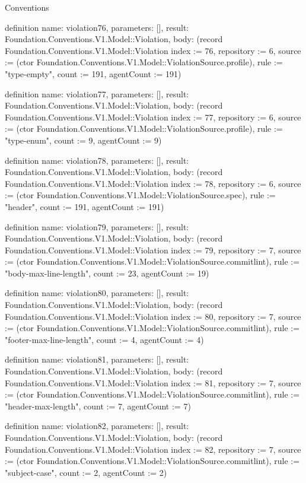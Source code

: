 \begin{lexlean}{Conventions}
\begin{semanticmodule}
definition{
  name: violation76,
  parameters: [],
  result: Foundation.Conventions.V1.Model::Violation,
  body: (record Foundation.Conventions.V1.Model::Violation {index := 76, repository := 6, source := (ctor Foundation.Conventions.V1.Model::ViolationSource.profile), rule := "type-empty", count := 191, agentCount := 191})
}

definition{
  name: violation77,
  parameters: [],
  result: Foundation.Conventions.V1.Model::Violation,
  body: (record Foundation.Conventions.V1.Model::Violation {index := 77, repository := 6, source := (ctor Foundation.Conventions.V1.Model::ViolationSource.profile), rule := "type-enum", count := 9, agentCount := 9})
}

definition{
  name: violation78,
  parameters: [],
  result: Foundation.Conventions.V1.Model::Violation,
  body: (record Foundation.Conventions.V1.Model::Violation {index := 78, repository := 6, source := (ctor Foundation.Conventions.V1.Model::ViolationSource.spec), rule := "header", count := 191, agentCount := 191})
}

definition{
  name: violation79,
  parameters: [],
  result: Foundation.Conventions.V1.Model::Violation,
  body: (record Foundation.Conventions.V1.Model::Violation {index := 79, repository := 7, source := (ctor Foundation.Conventions.V1.Model::ViolationSource.commitlint), rule := "body-max-line-length", count := 23, agentCount := 19})
}

definition{
  name: violation80,
  parameters: [],
  result: Foundation.Conventions.V1.Model::Violation,
  body: (record Foundation.Conventions.V1.Model::Violation {index := 80, repository := 7, source := (ctor Foundation.Conventions.V1.Model::ViolationSource.commitlint), rule := "footer-max-line-length", count := 4, agentCount := 4})
}

definition{
  name: violation81,
  parameters: [],
  result: Foundation.Conventions.V1.Model::Violation,
  body: (record Foundation.Conventions.V1.Model::Violation {index := 81, repository := 7, source := (ctor Foundation.Conventions.V1.Model::ViolationSource.commitlint), rule := "header-max-length", count := 7, agentCount := 7})
}

definition{
  name: violation82,
  parameters: [],
  result: Foundation.Conventions.V1.Model::Violation,
  body: (record Foundation.Conventions.V1.Model::Violation {index := 82, repository := 7, source := (ctor Foundation.Conventions.V1.Model::ViolationSource.commitlint), rule := "subject-case", count := 2, agentCount := 2})
}


\end{semanticmodule}
\end{lexlean}
